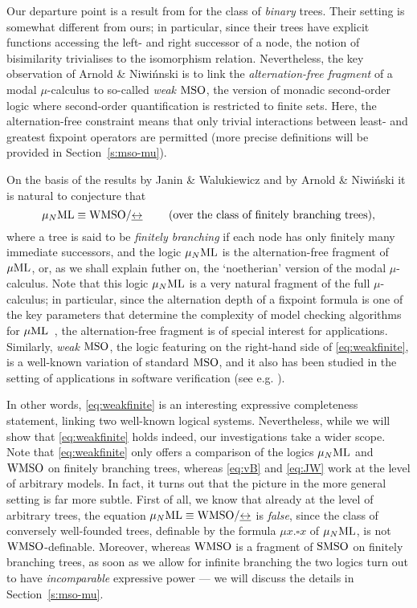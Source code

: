 Our departure point is a result from \cite{ArnNiw92} for the class of 
\emph{binary} trees.
Their setting is somewhat different from ours; in particular, since their trees
have explicit functions accessing the left- and right successor of a node,
the notion of bisimilarity trivialises to the isomorphism relation.
Nevertheless, the key observation of Arnold \& Niwi{\'n}nski is to link the 
\emph{alternation-free fragment} of a modal $\mu$-calculus to so-called 
\emph{weak} $\mathrm{MSO}$, the version of monadic second-order logic where second-order
quantification is restricted to finite sets.
Here, the alternation-free constraint means that only trivial interactions 
between least- and greatest fixpoint operators are permitted (more 
precise definitions will be provided in Section~\ref{s:mso-mu}).

On the basis of the results by Janin \& Walukiewicz and by Arnold \& 
Niwi{\'n}ski it is natural to conjecture that 
\begin{equation}
\label{eq:weakfinite}
\mu_{N}\mathrm{ML} \equiv \mathrm{WMSO}/{\mathrel{\underline{\leftrightarrow}}}  \qquad  \text{ (over the class of finitely 
branching trees)},
\end{equation}
where a tree is said to be \emph{finitely branching} if each node has only 
finitely many immediate successors, and the logic $\mu_{N}\mathrm{ML}$ is the 
alternation-free fragment of $\mu\mathrm{ML}$, or, as we shall explain futher on, the 
`noetherian' version of the modal $\mu$-calculus.
Note that this logic $\mu_{N}\mathrm{ML}$ is a very natural fragment of the full 
$\mu$-calculus; in particular, since the alternation depth of a fixpoint formula 
is one of the key parameters that determine the complexity of model checking 
algorithms for $\mu\mathrm{ML}$~\cite{calu:deci17},
the alternation-free fragment is of special interest for applications.
Similarly, \emph{weak} $\mathrm{MSO}$, the logic featuring on the right-hand side of 
\eqref{eq:weakfinite}, is a well-known variation of standard $\mathrm{MSO}$, and it also
has been studied in the setting of applications in software verification (see 
e.g. \cite[Ch. 3]{ALG02}).

In other words, \eqref{eq:weakfinite} is an interesting expressive completeness 
statement, linking two well-known logical systems.
Nevertheless, while we will show that \eqref{eq:weakfinite} holds indeed, our
investigations take a wider scope.
Note that \eqref{eq:weakfinite} only offers a comparison of the logics $\mu_{N}\mathrm{ML}$
and $\mathrm{WMSO}$ on finitely branching trees, whereas \eqref{eq:vB} and \eqref{eq:JW} 
work at the level of arbitrary models. 
In fact, it turns out that the picture in the more general setting is far more
subtle. 
First of all, we know that already at the level of arbitrary trees, the equation
$\mu_{N}\mathrm{ML} \equiv \mathrm{WMSO}/{\mathrel{\underline{\leftrightarrow}}}$ is \emph{false}, since the class of conversely
well-founded trees, definable by the formula $\mu x.\square x$ of $\mu_{N}\mathrm{ML}$, is 
not $\mathrm{WMSO}$-definable. 
Moreover, whereas $\mathrm{WMSO}$ is a fragment of $\mathrm{SMSO}$ on finitely branching trees,
as soon as we allow for infinite branching the two logics turn out to have
\emph{incomparable} expressive power --- we will discuss the details 
in Section~\ref{s:mso-mu}.

